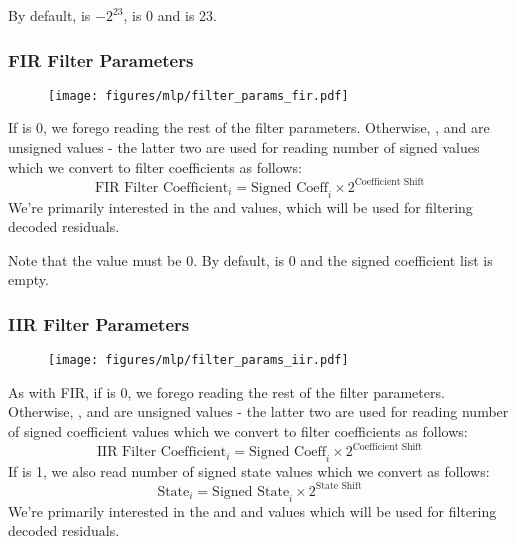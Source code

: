 By default,  is $-2 ^ {23}$,  is 0
and  is 23.

\clearpage

\subsubsection{FIR Filter Parameters}
\begin{figure}[h!]
\texttt{[image: figures/mlp/filter\_params\_fir.pdf]}
\end{figure}
\par
\noindent
If  is 0, we forego reading the rest of the filter parameters.
Otherwise, ,  and 
are unsigned values - the latter two are used for reading
 number of signed values
which we convert to filter coefficients as follows:
\begin{equation*}
\text{FIR Filter Coefficient}_i = \text{Signed Coeff}_i \times 2 ^ {\text{Coefficient Shift}}
\end{equation*}
We're primarily interested in the  and 
values, which will be used for filtering decoded residuals.

Note that the  value must be 0.  By default,
 is 0 and the signed coefficient list is empty.

\subsubsection{IIR Filter Parameters}
\begin{figure}[h]
\texttt{[image: figures/mlp/filter\_params\_iir.pdf]}
\end{figure}

As with FIR, if  is 0, we forego reading the rest of the
filter parameters.
Otherwise, ,  and 
are unsigned values - the latter two are used for reading
 number of signed coefficient values
which we convert to filter coefficients as follows:
\begin{equation*}
\text{IIR Filter Coefficient}_i = \text{Signed Coeff}_i \times 2 ^ {\text{Coefficient Shift}}
\end{equation*}
If  is 1, we also read  number of signed state
values which we convert as follows:
\begin{equation*}
\text{State}_i = \text{Signed State}_i \times 2 ^ {\text{State Shift}}
\end{equation*}
We're primarily interested in the  and 
and  values which will be used for filtering decoded residuals.

